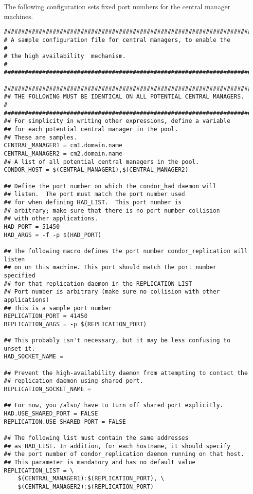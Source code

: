 The following configuration sets fixed port numbers for the central
manager machines.
\footnotesize
\begin{verbatim}
##########################################################################
# A sample configuration file for central managers, to enable the        #
# the high availability  mechanism.                                      #
##########################################################################

#########################################################################
## THE FOLLOWING MUST BE IDENTICAL ON ALL POTENTIAL CENTRAL MANAGERS.   # 
#########################################################################
## For simplicity in writing other expressions, define a variable
## for each potential central manager in the pool. 
## These are samples.
CENTRAL_MANAGER1 = cm1.domain.name
CENTRAL_MANAGER2 = cm2.domain.name
## A list of all potential central managers in the pool.
CONDOR_HOST = $(CENTRAL_MANAGER1),$(CENTRAL_MANAGER2)

## Define the port number on which the condor_had daemon will
## listen.  The port must match the port number used
## for when defining HAD_LIST.  This port number is
## arbitrary; make sure that there is no port number collision
## with other applications.
HAD_PORT = 51450
HAD_ARGS = -f -p $(HAD_PORT)

## The following macro defines the port number condor_replication will listen
## on on this machine. This port should match the port number specified
## for that replication daemon in the REPLICATION_LIST
## Port number is arbitrary (make sure no collision with other applications)
## This is a sample port number
REPLICATION_PORT = 41450
REPLICATION_ARGS = -p $(REPLICATION_PORT)

## This probably isn't necessary, but it may be less confusing to unset it.
HAD_SOCKET_NAME =

## Prevent the high-availability daemon from attempting to contact the
## replication daemon using shared port.
REPLICATION_SOCKET_NAME =

## For now, you /also/ have to turn off shared port explicitly.
HAD.USE_SHARED_PORT = FALSE
REPLICATION.USE_SHARED_PORT = FALSE

## The following list must contain the same addresses
## as HAD_LIST. In addition, for each hostname, it should specify 
## the port number of condor_replication daemon running on that host.
## This parameter is mandatory and has no default value
REPLICATION_LIST = \
	$(CENTRAL_MANAGER1):$(REPLICATION_PORT), \
	$(CENTRAL_MANAGER2):$(REPLICATION_PORT)


\end{verbatim}

